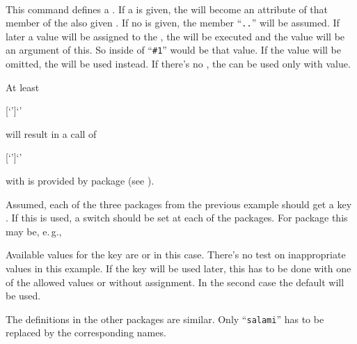 \begin{Declaration}
  \\
\end{Declaration}
%
This command defines a . If a  is given, the
 will become an attribute of that member of the also given
. If no  is given, the member
``\texttt{.}\texttt{.}'' will be assumed. If
later a value will be assigned to the , the  will be
executed and the value will be an argument of this. So inside of
 ``\lstinline{#1}'' would be that value. If the value will be
omitted, the  will be used instead. If there's no
, the  can be used only with value.
\begin{Explain}
  \label{explain:scrbase.macro.DefineFamilyKey}%
  At least
\begin{lstcode}[escapeinside=`']
                  [`']{`'}
\end{lstcode}
  will result in a call of
\begin{lstcode}[moretexcs={define@key},escapeinside=`']
             [`']{`'}
\end{lstcode}
  with  is provided by package
   (see \cite{package:keyval}).
\end{Explain}
\begin{Example}
  Assumed, each of the three packages from the previous example should get a
  key . If this is used, a switch should be set at each of
  the packages. For package  this may be, e.\,g.,
  Available values for the key are  or  in this
  case. There's no test on inappropriate values in this example. If the key
  will be used later, this has to be done with one of the allowed values or
  without assignment. In the second case the default  will be
  used.

  The definitions in the other packages are similar. Only ``\texttt{salami}''
  has to be replaced by the corresponding names.
\end{Example}
%
%


